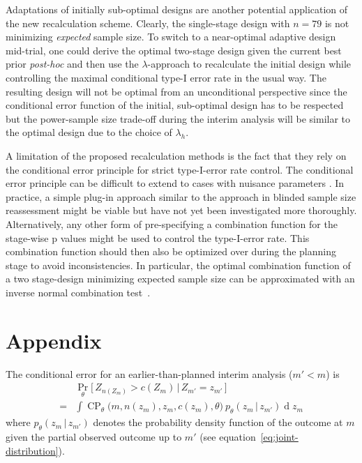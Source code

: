 \documentclass{article}
\renewcommand{\Pr}{\operatorname{Pr}}
\newcommand{\CP}{\ensuremath{\operatorname{CP}}}
\renewcommand{\Pr}{\ensuremath{\operatorname{Pr}}}
\newcommand{\cond}{\ensuremath{\,|\,}}
\begin{document}
Adaptations of initially sub-optimal designs are another potential 
application of the new recalculation scheme. 
Clearly, the single-stage design with $n=79$ is not minimizing 
\emph{expected} sample size. 
To switch to a near-optimal adaptive design mid-trial, 
one could derive the optimal two-stage design given the current best prior \textit{post-hoc} and 
then use the $\lambda$-approach to recalculate the initial design while controlling the maximal 
conditional type-I error rate in the usual way.
The resulting design will not be optimal from an unconditional perspective since the conditional error function of the initial, sub-optimal design has to be respected but the power-sample size trade-off during the interim analysis 
will be similar to the optimal design due to the choice of $\lambda_h$. 

A limitation of the proposed recalculation methods is the fact that they 
rely on the conditional error principle for strict type-I-error rate control.
The conditional error principle can be difficult to extend to cases with nuisance
parameters \citep{gutjahr2011}.
In practice, a simple plug-in approach similar to the approach in blinded sample size reassessment might be viable but have not yet been investigated more thoroughly.
Alternatively, any other form of pre-specifying a combination function for the stage-wise p values might be used to control the type-I-error rate.
This combination function should then also be optimized over during the planning stage 
to avoid inconsistencies. 
In particular, the optimal combination function of a two stage-design minimizing expected sample size can be approximated with an inverse normal combination test~\citep{pilz2019}.








\section*{Appendix}

The conditional error for an earlier-than-planned interim analysis ($m'<m$)
is 
\begin{align}
    & \Pr_\theta\big[\,Z_{n(Z_m)} > c(Z_m) \cond Z_{m'} = z_{m'}\,\big] \\
    =& \int \CP_\theta\big(m,n(z_m),z_m, c(z_m), \theta\big)\  p_\theta(z_m \cond z_{m'}) \operatorname{d} z_m
\end{align}
where $p_\theta(z_m \cond z_{m'})$ denotes the probability density function of the outcome at $m$ given the partial observed outcome up to $m'$ (see equation~\eqref{eq:joint-distribution}).
\end{document}
